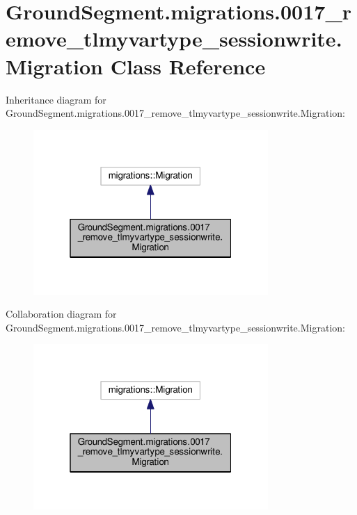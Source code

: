 \hypertarget{class_ground_segment_1_1migrations_1_10017__remove__tlmyvartype__sessionwrite_1_1_migration}{}\section{Ground\+Segment.\+migrations.0017\+\_\+remove\+\_\+tlmyvartype\+\_\+sessionwrite.Migration Class Reference}
\label{class_ground_segment_1_1migrations_1_10017__remove__tlmyvartype__sessionwrite_1_1_migration}


Inheritance diagram for Ground\+Segment.\+migrations.0017\+\_\+remove\+\_\+tlmyvartype\+\_\+sessionwrite.Migration\+:\nopagebreak
\begin{figure}[H]
\begin{center}
\leavevmode
\includegraphics[width=253pt]{class_ground_segment_1_1migrations_1_10017__remove__tlmyvartype__sessionwrite_1_1_migration__inherit__graph}
\end{center}
\end{figure}


Collaboration diagram for Ground\+Segment.\+migrations.0017\+\_\+remove\+\_\+tlmyvartype\+\_\+sessionwrite.Migration\+:\nopagebreak
\begin{figure}[H]
\begin{center}
\leavevmode
\includegraphics[width=253pt]{class_ground_segment_1_1migrations_1_10017__remove__tlmyvartype__sessionwrite_1_1_migration__coll__graph}
\end{center}
\end{figure}
